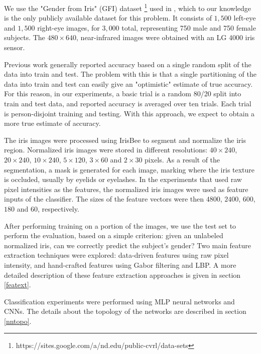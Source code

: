 \documentclass[10pt,twocolumn,letterpaper]{article}
\begin{document}
We use the "Gender from Iris" (GFI) dataset \footnote{https://sites.google.com/a/nd.edu/public-cvrl/data-sets} used in \cite{Tapia2016GenderCF}, which to our knowledge
is the only publicly available dataset for this problem.
It consists of 
$1,500$ left-eye and $1,500$ right-eye images, for $3,000$ total, representing 750 male and 750 female subjects. 
The $480\times640$, near-infrared images were obtained with an LG 4000 iris sensor.

Previous work generally reported accuracy based on a single random split of the data into train and test.
The problem with this is that a single partitioning of the data into train and test can easily give an "optimistic" estimate of true accuracy.
For this reason, in our experiments, a basic trial is a random 80/20 split into train and test data, 
and reported accuracy is averaged over ten trials. 
Each trial is person-disjoint training and testing. 
With this approach, we expect to obtain a more true estimate of accuracy.

The iris images were processed using IrisBee \cite{Liu2005} to segment and normalize the iris region. 
Normalized iris images were stored in different resolutions: $40\times240$, $20\times240$, $10\times240$, $5\times120$, $3\times60$ and $2\times30$ pixels. 
As a result of the segmentation, a mask is generated for each image, marking where the iris texture is occluded, usually by eyelids or eyelashes.
In the experiments that used raw pixel intensities as the features, the normalized iris images were used as feature inputs of the classifier. 
The sizes of the feature vectors were then $4800$, $2400$, $600$, $180$ and $60$, respectively. 

After performing training on a portion of the images, we use the test set to perform the evaluation, based on a simple criterion: given an unlabeled normalized iris, can we correctly predict the subject's gender? 
Two main feature extraction techniques were explored: data-driven features using raw pixel intensity, and hand-crafted features using Gabor filtering and LBP.
A more detailed description of these feature extraction approaches is given in section \ref{featext}.

Classification experiments were performed using MLP neural networks and CNNs. 
The details about the topology of the networks are described in section \ref{nntopo}.

\end{document}
